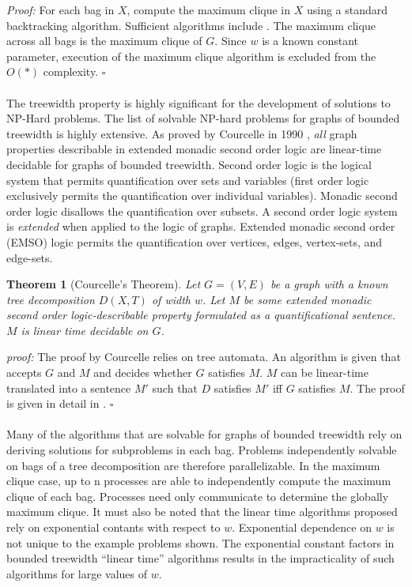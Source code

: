 \documentclass[12pt,conference]{IEEEtran}
\theoremstyle{plain}
\newtheorem{theorem}{Theorem}
\begin{document}
\textit{Proof:} For each bag in $X$, compute the maximum clique in $X$ using a standard backtracking algorithm. Sufficient algorithms include \cite{max-clique-exp-time}. The maximum clique across all bags is the maximum clique of $G$. Since $w$ is a known constant parameter, execution of the maximum clique algorithm is excluded from the $O(*)$ complexity. $\square$
\\
\\
The treewidth property is highly significant for the development of solutions to NP-Hard problems. The list of solvable NP-hard problems for graphs of bounded treewidth is highly extensive. As proved by Courcelle in 1990 \cite{courcelle-original}, \textit{all} graph properties describable in extended monadic second order logic are linear-time decidable for graphs of bounded treewidth. Second order logic is the logical system that permits quantification over sets and variables (first order logic exclusively permits the quantification over individual variables). Monadic second order logic disallows the quantification over subsets. A second order logic system is \textit{extended} when applied to the logic of graphs. Extended monadic second order (EMSO) logic permits the quantification over vertices, edges, vertex-sets, and edge-sets.

\begin{theorem}[Courcelle's Theorem]
  Let $G=(V,E)$ be a graph with a known tree decomposition $D(X,T)$ of width $w$. Let $M$ be some extended monadic second order logic-describable property formulated as a quantificational sentence. $M$ is linear time decidable on $G$.
\end{theorem}

\textit{proof:} 
  The proof by Courcelle relies on tree automata. An algorithm is given that accepts $G$ and $M$ and decides whether $G$ satisfies $M$. $M$ can be linear-time translated into a sentence $M'$ such that $D$ satisfies $M'$ iff $G$ satisfies $M$. The proof is given in detail in \cite{courcelle-original}. $\square$
\\
\\
Many of the algorithms that are solvable for graphs of bounded treewidth rely on deriving solutions for subproblems in each bag. Problems independently solvable on bags of a tree decomposition are therefore parallelizable. In the maximum clique case, up to n processes are able to independently compute the maximum clique of each bag. Processes need only communicate to determine the globally maximum clique. It must also be noted that the linear time algorithms proposed rely on exponential contants with respect to $w$. Exponential dependence on $w$ is not unique to the example problems shown. The exponential constant factors in bounded treewidth ``linear time'' algorithms results in the impracticality of such algorithms for large values of $w$.
\end{document}
